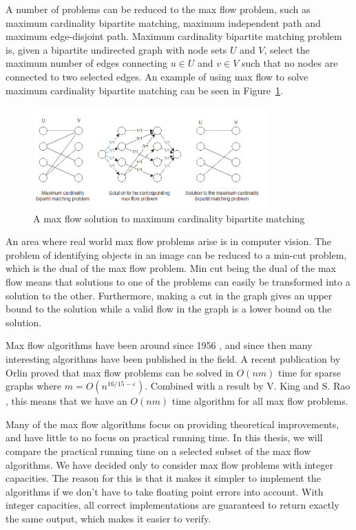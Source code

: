 A number of problems can be reduced to the max flow problem, such as maximum cardinality bipartite matching, maximum independent path and maximum edge-disjoint path.
Maximum cardinality bipartite matching problem is, given a bipartite undirected graph with node sets $U$ and $V$, 
select the maximum number of edges connecting $u\in U$ and $v \in V$ such that no nodes are connected to two selected edges.
An example of using max flow to solve maximum cardinality bipartite matching can be seen in Figure~\ref{maxCardinalityBipartiteMatchingExample}.
\begin{figure}[ht!]
\centering
\includegraphics[width=90mm]{MaxCardinalityBipartitMatchingExample.png}
\caption{A max flow solution to maximum cardinality bipartite matching}
\label{maxCardinalityBipartiteMatchingExample}
\end{figure}



An area where real world max flow problems arise is in computer vision. 
The problem of identifying objects in an image can be reduced to a min-cut problem, which is the dual of the max flow problem.
Min cut being the dual of the max flow means that solutions to one of the problems can easily be transformed into a solution to the other.
Furthermore, making a cut in the graph gives an upper bound to the solution while a valid flow in the graph is a lower bound on the solution.

Max flow algorithms have been around since 1956 \cite{FordFulkerson}, and since then many interesting algorithms have been published in the field.
A recent publication by Orlin \cite{Orlin13} proved that max flow problems can be solved in $O(nm)$ time for sparse graphs where $m=O(n^{16/15-\varepsilon})$.
Combined with a result by V. King and S. Rao \cite{King1992}, this means that we have an $O(nm)$ time algorithm for all max flow problems.

Many of the max flow algorithms focus on providing theoretical improvements, and have little to no focus on practical running time.
In this thesis, we will compare the practical running time on a selected subset of the max flow algorithms.
We have decided only to consider max flow problems with integer capacities. The reason for this is that it makes it simpler to implement the algorithms if we don't have to take floating point errors into account.
With integer capacities, all correct implementations are guaranteed to return exactly the same output, which makes it easier to verify.

